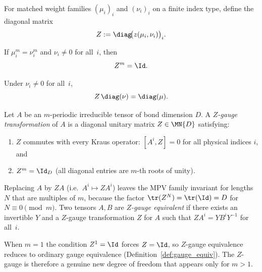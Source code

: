\begin{definition}\label{def:z_gauge_diagonal}
    \leanok
    For matched weight families $(\mu_i)_i$ and $(\nu_i)_i$ on a finite
    index type, define the diagonal matrix
    \[
        Z := \diag\!\bigl(z(\mu_i,\nu_i)\bigr)_i.
    \]
\end{definition}

\begin{lemma}%
    \label{lem:z_gauge_diagonal_pow}
    \leanok
    If $\mu_i^m=\nu_i^m$ and $\nu_i\neq 0$ for all~$i$, then
    \[
        Z^m=\Id.
    \]
\end{lemma}

\begin{lemma}\label{lem:z_gauge_diagonal_mul}
    \leanok
    Under $\nu_i\neq 0$ for all~$i$,
    \[
        Z\,\diag(\nu)=\diag(\mu).
    \]
\end{lemma}

\begin{definition}
    \label{def:z_gauge_equiv}
    \leanok
    Let $A$ be an $m$-periodic irreducible tensor of bond dimension $D$.
    A \emph{$Z$-gauge transformation} of $A$ is a diagonal unitary
    matrix $Z \in \MN{D}$ satisfying:
    \begin{enumerate}
        \item $Z$ commutes with every Kraus operator: $[A^i, Z] = 0$
              for all physical indices $i$, and
        \item $Z^m = \Id_D$ (all diagonal entries are $m$-th roots of unity).
    \end{enumerate}
    Replacing $A$ by $ZA$ (i.e.\ $A^i \mapsto Z A^i$) leaves the
    MPV family invariant for lengths $N$ that are multiples of $m$,
    because the factor $\tr(Z^N) = \tr(\Id) = D$ for $N \equiv 0 \pmod{m}$.
    Two tensors $A, B$ are \emph{$Z$-gauge equivalent} if there exists
    an invertible $Y$ and a $Z$-gauge transformation $Z$ for $A$ such that
    $Z A^i = Y B^i Y^{-1}$ for all~$i$.
\end{definition}

\begin{remark}
    \label{rem:z_gauge_trivial_period1}
    \leanok
    When $m = 1$ the condition $Z^1 = \Id$ forces $Z = \Id$,
    so $Z$-gauge equivalence reduces to ordinary gauge equivalence
    (Definition~\ref{def:gauge_equiv}).
    The $Z$-gauge is therefore a genuine new degree of freedom
    that appears only for $m > 1$.
\end{remark}

